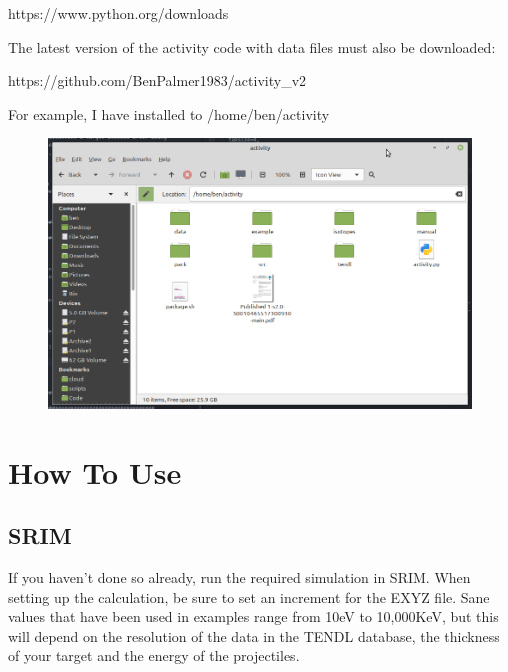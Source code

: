\documentclass[12pt,twoside]{manual}
\begin{document}
https://www.python.org/downloads

The latest version of the activity code with data files must also be downloaded:

https://github.com/BenPalmer1983/activity\_v2

For example, I have installed to /home/ben/activity

\FloatBarrier

\begin{figure}[h]
  \begin{center}
    \includegraphics[scale=0.50]{img/installdir}
  \end{center}
\end{figure}



\FloatBarrier


\chapter{How To Use}


\section{SRIM}

If you haven't done so already, run the required simulation in SRIM.  When setting up the calculation, be sure to set an increment for the EXYZ file.  Sane values that have been used in examples range from 10eV to 10,000KeV, but this will depend on the resolution of the data in the TENDL database, the thickness of your target and the energy of the projectiles.
\end{document}
